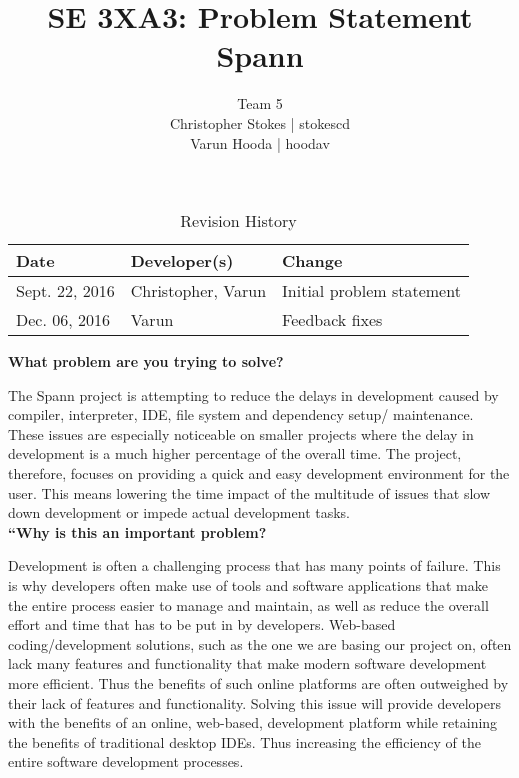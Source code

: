 \documentclass{article}
\title{SE 3XA3: Problem Statement\\Spann}
\author{Team 5
		\\ Christopher Stokes | stokescd
		\\ Varun Hooda | hoodav
}
\date{}
\begin{document}
\begin{table}[hp]
\caption{Revision History} \label{TblRevisionHistory}
\begin{tabularx}{\textwidth}{llX}
\toprule
\textbf{Date} & \textbf{Developer(s)} & \textbf{Change}\\
\midrule
    Sept. 22, 2016 & Christopher, Varun & Initial problem statement\\
    Dec. 06, 2016 & Varun & Feedback fixes\\
\bottomrule
\end{tabularx}
\end{table}

\newpage

\maketitle

\large
\textbf{What problem are you trying to solve?}\\
\normalsize

The Spann project is attempting to reduce the delays in development
caused by compiler, interpreter, IDE, file system and dependency setup/
maintenance. These issues are especially noticeable on smaller projects where
the delay in development is a much higher percentage of the overall time. The
project, therefore, focuses on providing a quick and easy development
environment for the user. This means lowering the time impact of the multitude
of issues that slow down development or impede actual development tasks.\\

\large
\textbf{“Why is this an important problem?}\\
\normalsize

Development is often a challenging process that has many points of failure.
This is why developers often make use of tools and software applications that
make the entire process easier to manage and maintain, as well as reduce the
overall effort and time that has to be put in by developers. Web-based
coding/development solutions, such as the one we are basing our project on,
often lack many features and functionality that make modern software
development more efficient. Thus the benefits of such online platforms are
often outweighed by their lack of features and functionality. Solving this
issue will provide developers with the benefits of an online, web-based,
development platform while retaining the benefits of traditional desktop IDEs.
Thus increasing the efficiency of the entire software development processes.\\
\end{document}
